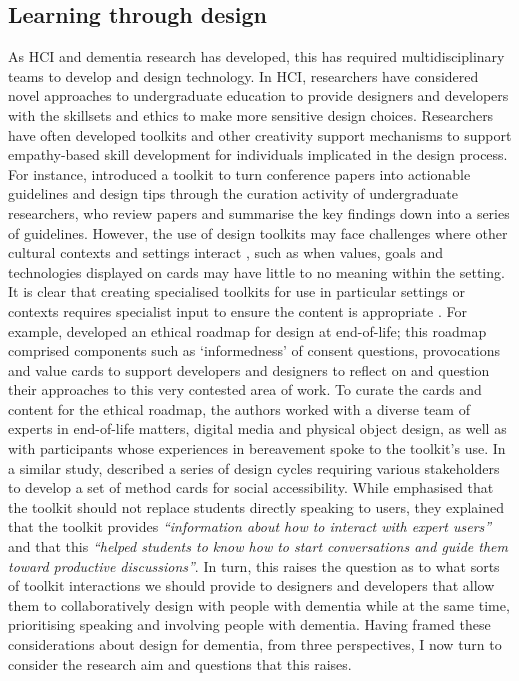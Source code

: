 \subsection{Learning through design}
\label{Dementia-Design}
As HCI and dementia research has developed, this has required multidisciplinary teams to develop and design technology. In HCI, researchers have considered novel approaches to undergraduate education to provide designers and developers with the skillsets and ethics to make more sensitive design choices. Researchers have often developed toolkits and other creativity support mechanisms to support empathy-based skill development for individuals implicated in the design process. For instance, \cite{chen2020interaction} introduced a toolkit to turn conference papers into actionable guidelines and design tips through the curation activity of undergraduate researchers, who review papers and summarise the key findings down into a series of guidelines. However, the use of design toolkits may face challenges where other cultural contexts and settings interact \citep{peters2020toolkits}, such as when values, goals and technologies displayed on cards may have little to no meaning within the setting.   
It is clear that creating specialised toolkits for use in particular settings or contexts requires specialist input to ensure the content is appropriate \citep{alshehri2020scenario,meissner2018schnittmuster}. For example, \cite{craig2021development} developed an ethical roadmap for design at end-of-life; this roadmap comprised components such as `informedness’ of consent questions, provocations and value cards to support developers and designers to reflect on and question their approaches to this very contested area of work. To curate the cards and content for the ethical roadmap, the authors worked with a diverse team of experts in end-of-life matters, digital media and physical object design, as well as with participants whose experiences in bereavement spoke to the toolkit’s use. In a similar study, \cite{shinohara2020design} described a series of design cycles requiring various stakeholders to develop a set of method cards for social accessibility. While \cite{shinohara2020design} emphasised that the toolkit should not replace students directly speaking to users, they explained that the toolkit provides \textit{``information about how to interact with expert users''} and that this \textit{``helped students to know how to start conversations and guide them toward productive discussions''}. In turn, this raises the question as to what sorts of toolkit interactions we should provide to designers and developers that allow them to collaboratively design with people with dementia while at the same time, prioritising speaking and involving people with dementia. Having framed these considerations about design for dementia, from three perspectives, I now turn to consider the research aim and questions that this raises.

